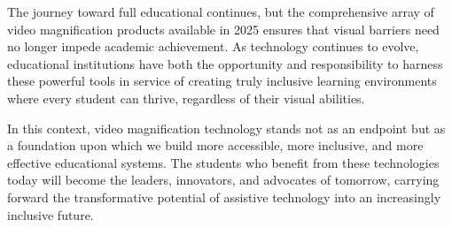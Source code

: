 The journey toward full educational  continues, but the comprehensive array of video magnification products available in 2025 ensures that visual barriers need no longer impede academic achievement. As technology continues to evolve, educational institutions have both the opportunity and responsibility to harness these powerful tools in service of creating truly inclusive learning environments where every student can thrive, regardless of their visual abilities.

In this context, video magnification technology stands not as an endpoint but as a foundation upon which we build more accessible, more inclusive, and more effective educational systems. The students who benefit from these technologies today will become the leaders, innovators, and advocates of tomorrow, carrying forward the transformative potential of assistive technology into an increasingly inclusive future.